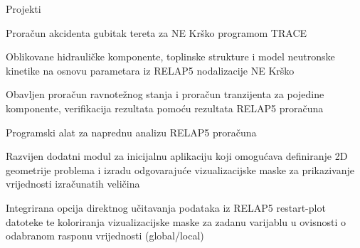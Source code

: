 \documentclass{resume} %
\begin{document}
\begin{rSection}{Projekti}

\begin{rSubsection}{Prora\v{c}un akcidenta gubitak tereta za NE Kr\v{s}ko programom TRACE}{}{}{}
\item Oblikovane hidrauli\v{c}ke komponente, toplinske strukture i model neutronske kinetike na osnovu parametara iz RELAP5 nodalizacije NE Kr\v{s}ko
\item Obavljen prora\v{c}un ravnote\v{z}nog stanja i prora\v{c}un tranzijenta za pojedine komponente, verifikacija rezultata pomo\'{c}u rezultata RELAP5 prora\v{c}una
\end{rSubsection}


\begin{rSubsection}{Programski alat za naprednu analizu RELAP5 prora\v{c}una}{}{}{}
\item Razvijen dodatni modul za inicijalnu aplikaciju koji omogu\'{c}ava definiranje 2D geometrije problema i izradu odgovaraju\'{c}e vizualizacijske maske za prikazivanje vrijednosti izra\v{c}unatih veli\v{c}ina
\item Integrirana opcija direktnog u\v{c}itavanja podataka iz RELAP5 restart-plot datoteke te koloriranja vizualizacijske maske za zadanu varijablu u ovisnosti o odabranom rasponu vrijednosti (global/local)
\end{rSubsection}



\end{rSection}
\end{document}
